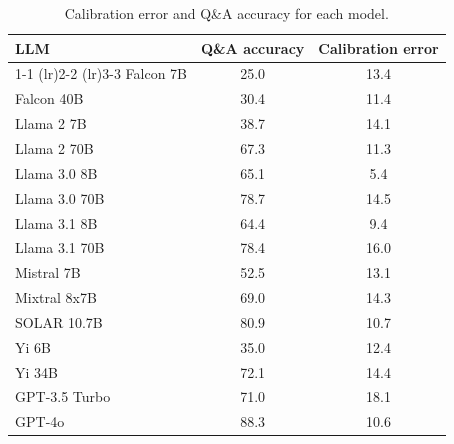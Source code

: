 \begin{table}[h]
\caption{Calibration error and Q\&A accuracy for each model.}
\label{tab:calibration_hellaswag_prob_max}
\centering
\begin{tabular}{lcc}
\toprule
LLM & Q\&A accuracy & Calibration error \\ 
\cmidrule(lr){1-1} \cmidrule(lr){2-2} \cmidrule(lr){3-3}
Falcon 7B & 25.0 & 13.4\\
Falcon 40B & 30.4 & 11.4\\
Llama 2 7B & 38.7 & 14.1\\
Llama 2 70B & 67.3 & 11.3\\
Llama 3.0 8B & 65.1 & 5.4\\
Llama 3.0 70B & 78.7 & 14.5\\
Llama 3.1 8B & 64.4 & 9.4\\
Llama 3.1 70B & 78.4 & 16.0\\
Mistral 7B & 52.5 & 13.1\\
Mixtral 8x7B & 69.0 & 14.3\\
SOLAR 10.7B & 80.9 & 10.7\\
Yi 6B & 35.0 & 12.4\\
Yi 34B & 72.1 & 14.4\\
GPT-3.5 Turbo & 71.0 & 18.1\\
GPT-4o & 88.3 & 10.6\\
\bottomrule
\end{tabular}
\end{table}
